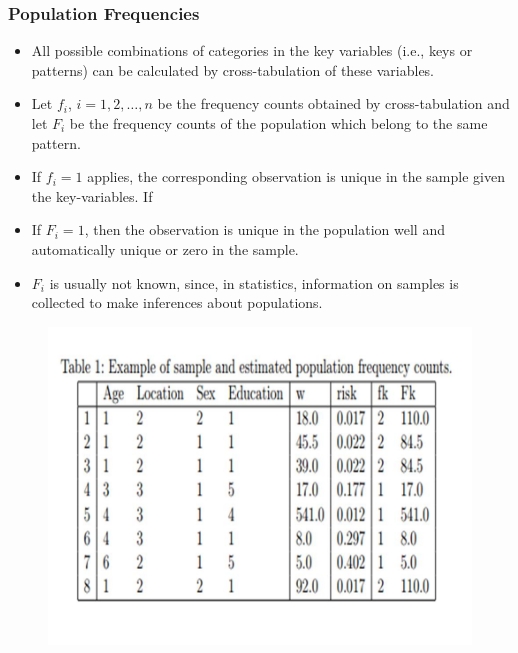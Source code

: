 \documentclass{beamer}
\begin{document}
\begin{frame}	
	\frametitle{Population Frequencies}
	
\begin{itemize}
	\item All possible combinations of categories in the key variables (i.e., keys or patterns)
	can be calculated by cross-tabulation of these variables.
	\item Let $f_i$, $i=1,2,\ldots,n$ be
	the frequency counts obtained by cross-tabulation and let $F_i$ be the frequency
	counts of the population which belong to the same pattern. 
	\item If $f_i=1$ applies,
	the corresponding observation is unique in the sample given the key-variables. If
	\item If $F_i = 1$, then the observation is unique in the population  well and automatically
	unique or zero in the sample.
	\item $F_i$ is usually not known, since, in statistics, information on samples is collected
	to make inferences about populations.
\end{itemize}
\end{frame}
\begin{frame}
	\begin{figure}
\centering
\includegraphics[width=0.9\linewidth]{JPEGS/TemplTable1}
\caption{}
\label{fig:TemplTable1}
\end{figure}

\end{frame}
\end{document}
